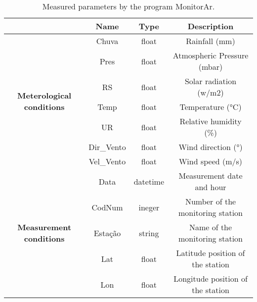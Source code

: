 \begin{table*}[t]
    \centering
    \begin{tabular}{c|c|c|c|}
        \cline{2-4}
                                                                                 & \textbf{Name} & \textbf{Type} & \textbf{Description}              \\ \hline
        \multicolumn{1}{|c|}{\multirow{7}{*}{\textbf{Meterological conditions}}} & Chuva         & float         & Rainfall (mm)                     \\ \cline{2-4} 
        \multicolumn{1}{|c|}{}                                                   & Pres          & float         & Atmospheric Pressure (mbar)       \\ \cline{2-4} 
        \multicolumn{1}{|c|}{}                                                   & RS            & float         & Solar radiation (w/m2)            \\ \cline{2-4} 
        \multicolumn{1}{|c|}{}                                                   & Temp          & float         & Temperature (°C)                  \\ \cline{2-4} 
        \multicolumn{1}{|c|}{}                                                   & UR            & float         & Relative humidity (\%)            \\ \cline{2-4} 
        \multicolumn{1}{|c|}{}                                                   & Dir\_Vento    & float         & Wind direction (°)                \\ \cline{2-4} 
        \multicolumn{1}{|c|}{}                                                   & Vel\_Vento    & float         & Wind speed (m/s)                  \\ \hline
        \multicolumn{1}{|c|}{\multirow{5}{*}{\textbf{Measurement conditions}}}   & Data          & datetime      & Measurement date and hour         \\ \cline{2-4} 
        \multicolumn{1}{|c|}{}                                                   & CodNum        & ineger        & Number of the monitoring station  \\ \cline{2-4} 
        \multicolumn{1}{|c|}{}                                                   & Estação       & string        & Name of the monitoring station    \\ \cline{2-4} 
        \multicolumn{1}{|c|}{}                                                   & Lat           & float         & Latitude position of the station  \\ \cline{2-4} 
        \multicolumn{1}{|c|}{}                                                   & Lon           & float         & Longitude position of the station \\ \hline
        \end{tabular}
    \caption{Measured parameters by the program MonitorAr.}
    \label{tab:measured-data}
\end{table*}

